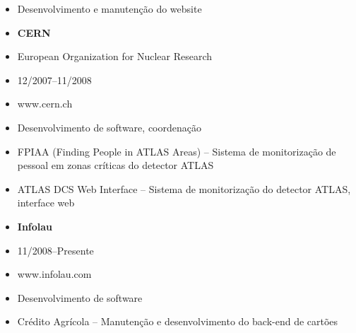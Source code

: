 \documentclass[a4paper,portuguese]{article}
\begin{document}
\begin{minipage}[t]{0.5\linewidth}
    \begin{itemize}
    \setlength{\itemsep}{-1mm}
        \item[] Desenvolvimento e manutenção do website
    \end{itemize}
\end{minipage}
\vspace{0.5cm}
\begin{minipage}[t]{0.5\linewidth}
    \begin{itemize}
    \setlength{\itemsep}{-1mm}
        \item[] {\bf CERN }
        \item[] European Organization for Nuclear Research
        \item[] 12/2007--11/2008
        \item[] www.cern.ch
    \end{itemize}
\end{minipage}
\begin{minipage}[t]{0.5\linewidth}
    \begin{itemize}
    \setlength{\itemsep}{-1mm}
        \item[] Desenvolvimento de software, coordenação
        \item[] FPIAA (Finding People in ATLAS Areas) -- Sistema de monitorização de pessoal em zonas críticas do detector ATLAS
        \item[] ATLAS DCS Web Interface -- Sistema de monitorização do detector ATLAS, interface web
    \end{itemize}
\end{minipage}
\vspace{0.5cm}
\begin{minipage}[t]{0.5\linewidth}
    \begin{itemize}
    \setlength{\itemsep}{-1mm}
        \item[] {\bf Infolau}
        \item[] 11/2008--Presente
        \item[] www.infolau.com
    \end{itemize}
\end{minipage}
\begin{minipage}[t]{0.5\linewidth}
    \begin{itemize}
    \setlength{\itemsep}{-1mm}
        \item[] Desenvolvimento de software
        \item[] Crédito Agrícola -- Manutenção e desenvolvimento do back-end de cartões
    \end{itemize}
\end{minipage}
\end{document}
